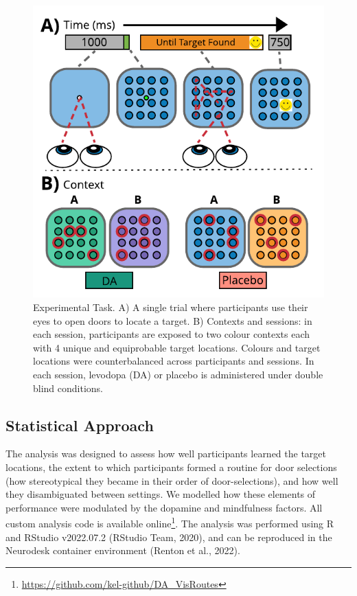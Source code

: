 \documentclass[
  man]{apa6}
\begin{document}
\begin{figure}

{\centering \includegraphics[width=0.7\linewidth]{../../images/DA_ExpTask} 

}

\caption{Experimental Task. A) A single trial where participants use their eyes to open doors to locate a target. B) Contexts and sessions: in each session, participants are exposed to two colour contexts each with 4 unique and equiprobable target locations. Colours and target locations were counterbalanced across participants and sessions. In each session, levodopa (DA) or placebo is administered under double blind conditions.}\label{fig:taskfig}
\end{figure}

\hypertarget{statistical-approach}{%
\subsection{Statistical Approach}\label{statistical-approach}}

\label{sec:Statistical Approach}

The analysis was designed to assess how well participants learned the target locations, the extent to which participants formed a routine for door selections (how stereotypical they became in their order of door-selections), and how well they disambiguated between settings. We modelled how these elements of performance were modulated by the dopamine and mindfulness factors. All custom analysis code is available online\footnote{\url{https://github.com/kel-github/DA_VisRoutes}}. The analysis was performed using R and RStudio v2022.07.2 (RStudio Team, 2020), and can be reproduced in the Neurodesk container environment (Renton et al., 2022).
\end{document}
